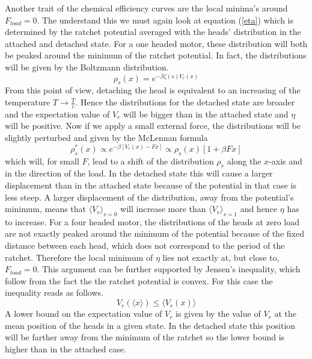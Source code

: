 \documentclass[aps,pre,twocolumn,showpacs,showkeys,a4paper]{revtex4}
\begin{document}
Another trait of the chemical efficiency curves are the local minima's around $F_{load}=0$. 
The understand this we must again look at equation (\ref{eta}) which is determined by the ratchet potential averaged with the heads' distribution in the attached and detached state. 
For a one headed motor, these distribution will both be peaked around the minimum of the ratchet potential. 
In fact, the distributions will be given by the Boltzmann distribution.
\begin{equation}
\rho_s (x) = e^{-\beta \zeta(s) V_r(x)}
\end{equation} 
From this point of view, detaching the head is equivalent to an increasing of the temperature $T\rightarrow\frac{T}{c}$. 
Hence the distributions for the detached state are broader and the expectation value of $V_r$ will be bigger than in the attached state and $\eta$ will be positive. 
Now if we apply a small external force, the distributions will be slightly perturbed and given by the McLennan formula
\begin{equation}
\rho_s^*(x) \propto e^{-\beta \left[V_r(x) - F x\right]}\propto \rho_s(x)\left[1 + \beta F x\right]
\end{equation}
which will, for small $F$, lead to a shift of the distribution $\rho_s$ along the $x$-axis and in the direction of the load. 
In the detached state this will cause a larger displacement than in the attached state because of the potential in that case is less steep. 
A larger displacement of the distribution, away from the potential's minimum, means that $\langle V_r \rangle_{s=0}$ will increase more than $\langle V_r \rangle_{s=1}$ and hence $\eta$ has to increase. 
For a four headed motor, the distributions of the heads at zero load are not exactly peaked around the minimum of the potential because of the fixed distance between each head,  which does not correspond to the period of the ratchet. 
Therefore the local minimum of $\eta$ lies not exactly at, but close to, $F_{load} =0$.
This argument can be further supported by Jensen's inequality, which follow from the fact the the ratchet potential is convex. For this case the inequality reads as follows.
\begin{equation}
V_r(\langle x \rangle) \leq \langle V_r(x) \rangle
\end{equation} 
A lower bound on the expectation value of $V_r$ is given by the value of $V_r$ at the mean position of the heads in a given state. 
In the detached state this position will be farther away from the minimum of the ratchet so the lower bound is higher than in the attached case.
\end{document}
